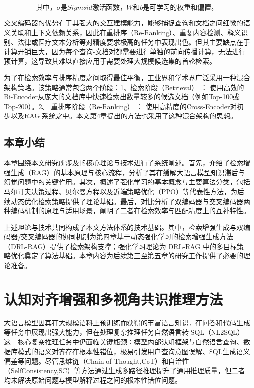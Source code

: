 \documentclass[12pt,a4paper,openright,UTF8]{ctexbook}
\begin{document}
\begin{equation}
其中，\sigma 是Sigmoid 激活函数，W 和b 是可学习的权重和偏置。
\end{equation}

交叉编码器的优势在于其强大的交互建模能力，能够捕捉查询和文档之间细微的语义关联和上下文依赖关系，因此在重排序（Re-Ranking）、重复内容检测、释义识别、法律或医疗文本分析等对精度要求极高的任务中表现出色。但其主要缺点在于计算开销巨大，因为每个查询-文档对都需要进行单独的前向传播计算，无法进行预计算，这导致其难以直接应用于需要处理大规模候选集的首轮检索。


为了在检索效率与排序精度之间取得最佳平衡，工业界和学术界广泛采用一种混合架构策略。该策略通常包含两个阶段：1、检索阶段（Retrieval） ： 使用高效的Bi-Encoder从庞大的文档库中快速检索出数量较多的候选文档（例如Top-100或Top-200）。2、 重排序阶段（Re-Ranking） ： 使用高精度的Cross-Encoder对初步以及RAG 系统之中。本文第4章提出的方法也采用了这种混合架构的思想。

\section{本章小结}

本章围绕本文研究所涉及的核心理论与技术进行了系统阐述。首先，介绍了检索增强生成（RAG）的基本原理与核心流程，分析了其在缓解大语言模型知识滞后与幻觉问题中的关键作用。其次，概述了强化学习的基本概念与主要算法分类，包括马尔可夫决策过程、贝尔曼方程以及近端策略优化（PPO）等代表性方法，为后续动态优化检索策略提供了理论基础。最后，对比分析了双编码器与交叉编码器两种编码机制的原理与适用场景，阐明了二者在检索效率与匹配精度上的互补特性。


上述理论与技术共同构成了本文方法体系的技术基础。其中，检索增强生成与双编码器/交叉编码器的协同机制为第四章基于动态强化学习的检索增强生成方法（DRL-RAG）提供了检索架构支撑；强化学习理论为 DRL-RAG 中的多目标策略优化奠定了算法基础。本章内容为后续第三至第五章的研究工作提供了必要的理论准备。

\chapter{认知对齐增强和多视角共识推理方法}

大语言模型因其在大规模语料上预训练而获得的丰富语言知识，在问答和代码生成等任务中展现出强大能力，但在处理复杂推理任务自然语言转 SQL（NL2SQL）这一核心复杂推理任务中仍面临关键瓶颈：模型内部认知框架与自然语言查询、数据库模式的语义对齐存在根本性错位，极易引发用户查询意图误解、SQL生成语义偏差等问题。尽管思维链（Chain-of-Thought,CoT）和自洽性（SelfConsistency,SC）等方法通过生成多路径推理提升了通用推理质量，但二者均未解决原始问题与模型解释过程之间的根本性错位问题。
\end{document}
